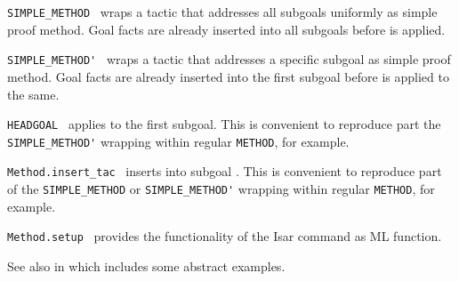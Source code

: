 \begin{isabellebody}
\begin{isamarkuptext}
\begin{description}
  \item \verb|SIMPLE_METHOD|~ wraps a tactic that
  addresses all subgoals uniformly as simple proof method.  Goal facts
  are already inserted into all subgoals before  is
  applied.

  \item \verb|SIMPLE_METHOD'|~ wraps a tactic that
  addresses a specific subgoal as simple proof method.  Goal facts are
  already inserted into the first subgoal before  is
  applied to the same.

  \item \verb|HEADGOAL|~ applies  to
  the first subgoal.  This is convenient to reproduce part the \verb|SIMPLE_METHOD'| wrapping within regular \verb|METHOD|, for example.

  \item \verb|Method.insert_tac|~ inserts  into subgoal .  This is convenient to reproduce
  part of the \verb|SIMPLE_METHOD| or \verb|SIMPLE_METHOD'| wrapping
  within regular \verb|METHOD|, for example.

  \item \verb|Method.setup|~ provides
  the functionality of the Isar command \hyperlink{command.method-setup}{\mbox{}} as ML
  function.

  \end{description}%
\end{isamarkuptext}%
\isamarkuptrue%
%
\endisatagmlref
{\isafoldmlref}%
%
\isadelimmlref
%
\endisadelimmlref
%
\isadelimmlex
%
\endisadelimmlex
%
\isatagmlex
%
\begin{isamarkuptext}%
See also \hyperlink{command.method-setup}{\mbox{}} in
  \cite{isabelle-isar-ref} which includes some abstract examples.


\end{isamarkuptext}
\end{isabellebody}
